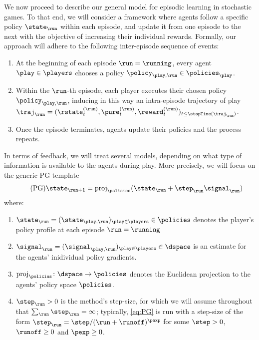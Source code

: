 

We now proceed to describe our general model for episodic learning in stochastic games.
To that end, we will consider a framework where agents follow a specific policy $\curr$ within each episode, and update it from one episode to the next with the objective of increasing their individual rewards.
Formally, our approach will adhere to the following inter-episode sequence of events:
\begin{enumerate}
\item
At the beginning of each episode $\run=\running$, every agent $\play\in\players$ chooses a policy $\policy_{\play,\run} \in \policies_{\play}$.
\item
Within the $\run$-th episode, each player executes their chosen policy $\policy_{\play,\run}$, inducing in this way an intra-episode trajectory of play $\traj_{\run} = (\rstate^{(\run)}_{\time}, \pure^{(\run)}_{\time}, \reward^{(\run)}_{\time})_{\time \leq \stopTime(\traj_{\run})}$.
\item
Once the episode terminates, agents update their policies and the process repeats.
\end{enumerate}

In terms of feedback, we will treat several models, depending on what type of information is available to the agents during play.
More precisely, we will focus on the generic \ac{PG} template
\begin{equation}
\label{eq:PG}
\tag{PG}
\next
	= \proj_{\policies}(\curr + \curr[\step] \curr[\signal])
\end{equation}
where:
\begin{enumerate}
\item
$\curr = (\state_{\play,\run})_{\play\in\players} \in \policies$ denotes the player's policy profile at each episode $\run=\running$
\item
$\curr[\signal] = (\signal_{\play,\run})_{\play\in\players} \in \dspace$ is an estimate for the agents' inidividual policy gradients.
\item
$\proj_{\policies}\from \dspace \to \policies$ denotes the Euclidean projection to the agents' policy space $\policies$.
\item
$\curr[\step] > 0$ is the method's step-size,
for which we will assume throughout that $\sum_{\run} \curr[\step] = \infty$;
typically, \eqref{eq:PG} is run with a step-size of the form $\curr[\step] = \step/(\run + \runoff)^{\pexp}$ for some $\step>0$, $\runoff\geq0$ and $\pexp\geq0$.
\end{enumerate}

